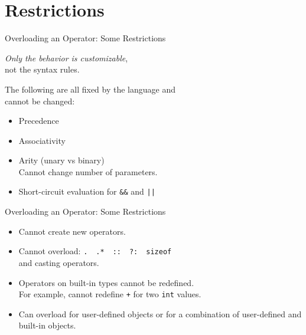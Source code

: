 \documentclass[14pt,aspectratio=1610, hyperref={pdfpagelayout=SinglePage}]{beamer}
\begin{document}
\section{Restrictions}
\begin{frame}[fragile]{Overloading an Operator: Some Restrictions}

\emph{Only the behavior is customizable},\\ not the syntax rules.

The following are all fixed by the language and\\ cannot be changed:

\pause{}
\begin{itemize}[<+->]
\item
  Precedence

\item
  Associativity

\item
  Arity (unary vs binary)\\
  Cannot change number of parameters.

\item
  Short-circuit evaluation for \lstinline{&&} and \lstinline{||}
\end{itemize}
\end{frame}

\begin{frame}[fragile]{Overloading an Operator: Some Restrictions}
\begin{itemize}[<+->]
\item
  Cannot create new operators.
\item
  Cannot overload: \lstinline{.}~~\lstinline{.*}~~\lstinline{::}~~\lstinline{?:}~~\lstinline{sizeof}~~\\
  and casting operators.
\item
  Operators on built-in types cannot be redefined.\\
  For example, cannot redefine \lstinline{+} for two \lstinline{int} values.
\item
  Can overload for user-defined objects or for a combination of
  user-defined and built-in objects.
\end{itemize}
\end{frame}


\end{document}
